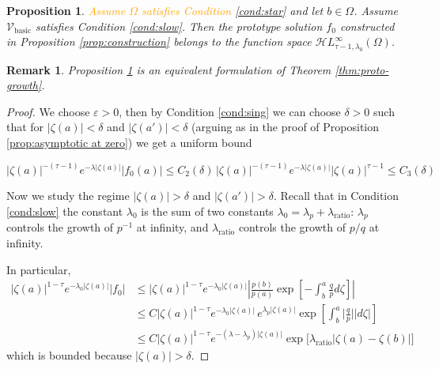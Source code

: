 \documentclass{article}
\theoremstyle{plain}
\newtheorem{prop}{Proposition}
\newtheorem{rmk}{Remark}
\newcommand{\singexp}[2]{\mathcal{H}L^\infty_{#1, #2}}
\newcommand{\hardpart}{\mathcal{V}_\text{basic}}
\newcommand{\domain}{\Omega}
\begin{document}
\begin{prop}\label{prop:asymptotic at infinity}
    \textcolor{orange}{Assume $\domain$ satisfies Condition \eqref{cond:star}} and let $b\in\domain$. Assume $\hardpart$ satisfies {\em Condition} \eqref{cond:slow}. Then the prototype solution $f_0$ constructed in {\em Proposition \ref{prop:construction}} belongs to the function space $\singexp{\tau-1}{\lambda_0}(\domain)$.
\end{prop}

\begin{rmk}
    {\em Proposition \ref{prop:asymptotic at infinity}} is an equivalent formulation of {\em Theorem \ref{thm:proto-growth}}.
\end{rmk}

\begin{proof}

We choose $\varepsilon>0$, then by Condition \eqref{cond:sing} we can choose $\delta>0$ such that for $|\zeta(a)|<\delta$ and $|\zeta(a')|<\delta$ (arguing as in the proof of Proposition \ref{prop:asymptotic at zero}) we get a uniform bound 

\[   |\zeta(a)|^{-(\tau-1)} e^{-\lambda |\zeta(a)|} |f_0(a)|\leq  C_2(\delta)\, |\zeta(a)|^{-(\tau-1)} e^{-\lambda |\zeta(a)|} |\zeta(a)|^{\tau-1} \leq C_3(\delta)
\]

Now we study the regime $|\zeta(a)|>\delta$ and $|\zeta(a')|>\delta$. Recall that in Condition \eqref{cond:slow} the constant $\lambda_0$ is the sum of two constants $\lambda_0=\lambda_p+\lambda_\text{ratio}$: $\lambda_p$ controls the growth of $p^{-1}$ at infinity, and $\lambda_\text{ratio}$ controls the growth of $p/q$ at infinity. 

In particular, 
      \begin{align*}
          |\zeta(a)|^{1-\tau} e^{-\lambda_0 |\zeta(a)|} |f_0|&\leq  |\zeta(a)|^{1-\tau} e^{-\lambda_0 |\zeta(a)|} \left\vert\frac{p(b)}{p(a)}\exp\left[-\int_{b}^{a}\frac{q}{p} d\zeta\right]\right\vert \\
          &\leq C  |\zeta(a)|^{1-\tau} e^{-\lambda_0 |\zeta(a)|}  \, e^{\lambda_p|\zeta(a)|}\exp\left[\int_{b}^{a} \Big\vert\frac{q}{p} \Big\vert |d\zeta| \right]\\
          & \leq C |\zeta(a)|^{1-\tau} e^{-(\lambda-\lambda_p) |\zeta(a)|} \exp\Big[\lambda_\text{ratio} |\zeta(a)-\zeta(b)| \Big]
      \end{align*}
   which is bounded because $|\zeta(a)|>\delta$. 


\end{proof}
\end{document}
